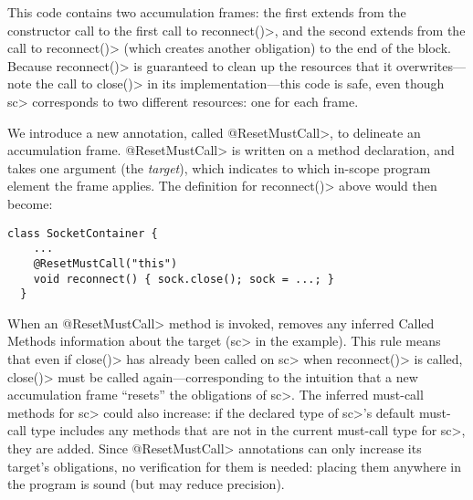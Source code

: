 This code contains two accumulation frames: the first extends from the
constructor call to the first call to \<reconnect()>, and the second
extends from the call to \<reconnect()> (which creates another
obligation) to the end of the block. Because \<reconnect()> is guaranteed
to clean up the resources that it overwrites---note the call
to \<close()> in its implementation---this code is safe, even though \<sc>
corresponds to two different resources: one for each frame.

We introduce a new annotation, called \<@ResetMustCall>, to delineate
an accumulation frame. \<@ResetMustCall> is written on a method
declaration, and takes one argument (the \emph{target}), which
indicates to which in-scope program element the frame applies. The
definition for \<reconnect()> above would then become:

\begin{lstlisting}[frame=tb,belowskip=3mm]
  class SocketContainer {
    ...
    @ResetMustCall("this")
    void reconnect() { sock.close(); sock = ...; }
  }
\end{lstlisting}

When an \<@ResetMustCall>
method is invoked, \tool removes any
inferred Called Methods information about the target (\<sc> in the example).
This rule means that even if \<close()> has already been called on \<sc>
when \<reconnect()>
is called, \<close()> must be called again---corresponding to the intuition
that a new accumulation frame ``resets'' the obligations of \<sc>.
The inferred must-call methods for \<sc> could also increase:
if the declared type of \<sc>'s default must-call type includes any
methods that are not in the current must-call type for \<sc>, they are added.
Since \<@ResetMustCall> annotations can only increase its target's obligations,
no verification for them is needed: placing them anywhere in the program is sound
(but may reduce precision).

